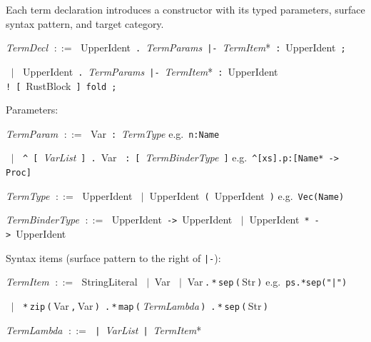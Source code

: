 \documentclass[11pt,a4paper]{article}
\newcommand{\kw}[1]{\texttt{\textcolor{kw}{#1}}}       %
\newcommand{\sym}[1]{\texttt{#1}}                       %
\newcommand{\nt}[1]{\textit{\textcolor{nt}{#1}}}        %
\newcommand{\tok}[1]{\textsf{#1}}                       %
\newcommand{\OR}{\ensuremath{\;\mid\;}}                  %
\newcommand{\bnfdef}{\ensuremath{\;::=\;}}               %
\newenvironment{grammar}{%
  \par\smallskip\begin{list}{}{%
    \setlength{\leftmargin}{1.5em}%
    \setlength{\itemsep}{2pt}%
    \setlength{\parsep}{0pt}}%
}{\end{list}\smallskip}
\begin{document}
Each term declaration introduces a constructor with its typed parameters,
surface syntax pattern, and target category.

\begin{grammar}
\item \nt{TermDecl} \bnfdef
    \tok{UpperIdent}~\sym{.}~\nt{TermParams}~\sym{|-}~\nt{TermItem}*~\sym{:}~\tok{UpperIdent}~\sym{;}
\item \phantom{\nt{TermDecl}} \OR
    \tok{UpperIdent}~\sym{.}~\nt{TermParams}~\sym{|-}~\nt{TermItem}*~\sym{:}~\tok{UpperIdent}~%
    \sym{!}~\sym{[}~\tok{RustBlock}~\sym{]}~\kw{fold}~\sym{;}
\end{grammar}

\medskip\noindent Parameters:

\begin{grammar}
\item \nt{TermParam} \bnfdef
    \tok{Var}~\sym{:}~\nt{TermType}
    \hfill\textcolor{cmt}{e.g.\ \texttt{n:Name}}
\item \phantom{\nt{TermParam}} \OR
    \sym{\^{}}~\sym{[}~\nt{VarList}~\sym{]}~\sym{.}~\tok{Var}~%
    \sym{:}~\sym{[}~\nt{TermBinderType}~\sym{]}
    \hfill\textcolor{cmt}{e.g.\ \texttt{\^{}[xs].p:[Name* -> Proc]}}
\item \nt{TermType} \bnfdef
    \tok{UpperIdent}
    \OR \tok{UpperIdent}~\sym{(}~\tok{UpperIdent}~\sym{)}
    \hfill\textcolor{cmt}{e.g.\ \texttt{Vec(Name)}}
\item \nt{TermBinderType} \bnfdef
    \tok{UpperIdent}~\sym{->}~\tok{UpperIdent}
    \OR \tok{UpperIdent}~\sym{*}~\sym{->}~\tok{UpperIdent}
\end{grammar}

\medskip\noindent Syntax items (surface pattern to the right of \sym{|-}):

\begin{grammar}
\item \nt{TermItem} \bnfdef
    \tok{StringLiteral}
    \OR \tok{Var}
    \OR \tok{Var}\,\sym{.}\,\sym{*}\,\kw{sep}\,\sym{(}\,\tok{Str}\,\sym{)}
    \hfill\textcolor{cmt}{e.g.\ \texttt{ps.*sep("|")}}
\item \phantom{\nt{TermItem}} \OR
    \sym{*}\,\kw{zip}\,\sym{(}\,\tok{Var}\,\sym{,}\,\tok{Var}\,\sym{)}\,%
    \sym{.}\,\sym{*}\,\kw{map}\,\sym{(}\,\nt{TermLambda}\,\sym{)}\,%
    \sym{.}\,\sym{*}\,\kw{sep}\,\sym{(}\,\tok{Str}\,\sym{)}
\item \nt{TermLambda} \bnfdef
    \sym{|}~\nt{VarList}~\sym{|}~\nt{TermItem}*
\end{grammar}
\end{document}
